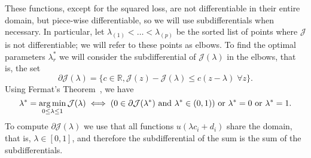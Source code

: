 %
These functions, except for the squared loss, are not differentiable in their entire domain, but piece-wise differentiable, so we will use subdifferentials when necessary.  In particular, let ${\lambda}_{(1)} < \ldots < {\lambda}_{(p)}$ be the sorted list of points where $\mathcal{J}$ is not differentiable; we will refer to these points as elbows.
To find the optimal parameters $\lambda_r^*$ we will consider the subdifferential of $\mathcal{J}(\lambda)$ in the elbows, that is, the set $$\partial \mathcal{J}(\lambda) = \{c \in \mathbb{R}, \mathcal{J}(z)-\mathcal{J}(\lambda) \leq c (z - \lambda)\;  \forall z \} .$$
%
Using Fermat's Theorem~\citep{BauschkeC11}, we have
\begin{equation}
    \nonumber
    \lambda^* = \operatorname*{arg\min}_{0 \leq \lambda \leq 1} \mathcal{J}(\lambda) \iff (0 \in \partial \mathcal{J}(\lambda^*) \text{ and } \lambda^* \in (0, 1) ) \text{ or } \lambda^*=0 \text{ or } \lambda^*=1 .
\end{equation}
To compute $\partial \mathcal{J}(\lambda)$ we use that all functions $u(\lambda c_i + d_i)$ share the domain, that is, $\lambda \in [0, 1]$, and therefore the subdifferential of the sum is the sum of the subdifferentials.
%


